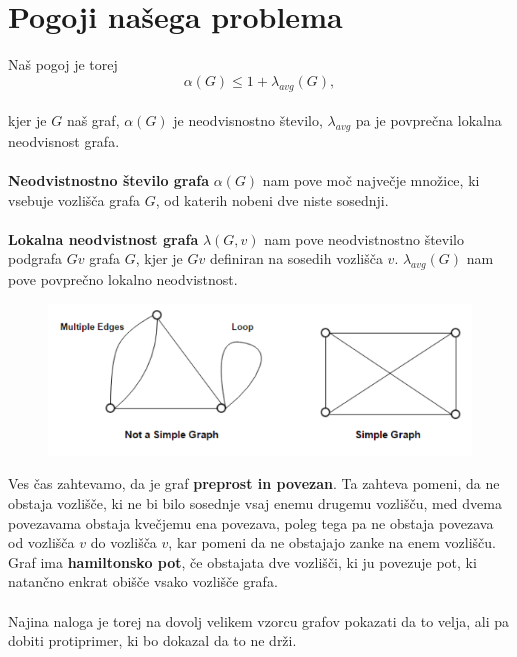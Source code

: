 \documentclass[12pt,a4paper]{amsart}
\theoremstyle{definition} %
\theoremstyle{plain} %
\begin{document}
\section{Pogoji našega problema}
Naš pogoj je torej 
\ \\
$$ \alpha(G) \leq 1 + \lambda_{avg}(G),$$
\ \\
kjer je $G$ naš graf, $\alpha(G)$ je neodvisnostno število, $\lambda_{avg}$ pa je povprečna lokalna neodvisnost grafa.\\
\ \\
\textbf{Neodvistnostno število grafa} $\alpha(G)$ nam pove moč največje množice, ki vsebuje  vozlišča grafa $G$, od katerih nobeni dve niste sosednji.\\
\ \\
\textbf{Lokalna neodvistnost grafa} $\lambda(G, v)$ nam pove neodvistnostno število podgrafa $Gv$ grafa $G$, kjer je $Gv$ definiran na sosedih vozlišča $v$. $\lambda_{avg}(G)$ nam pove povprečno lokalno neodvistnost.\\
\begin{figure}[h]
	\centering

	\includegraphics[scale=0.8]{slike/graf1}
\end{figure}

Ves čas zahtevamo, da je graf \textbf{preprost in povezan}. Ta zahteva pomeni, da ne obstaja vozlišče, ki ne bi bilo sosednje vsaj enemu drugemu vozlišču,  med dvema povezavama obstaja kvečjemu ena povezava, poleg tega pa ne obstaja  povezava od vozlišča $v$ do vozlišča $v$, kar pomeni da ne obstajajo zanke na enem vozlišču.\\
 
Graf ima \textbf{hamiltonsko pot}, če obstajata dve vozlišči, ki ju povezuje pot, ki natančno enkrat obišče vsako vozlišče grafa.\\
\ \\
Najina naloga je torej na dovolj velikem vzorcu grafov pokazati da to velja, ali pa dobiti protiprimer, ki bo dokazal da to ne drži.\\
\end{document}
